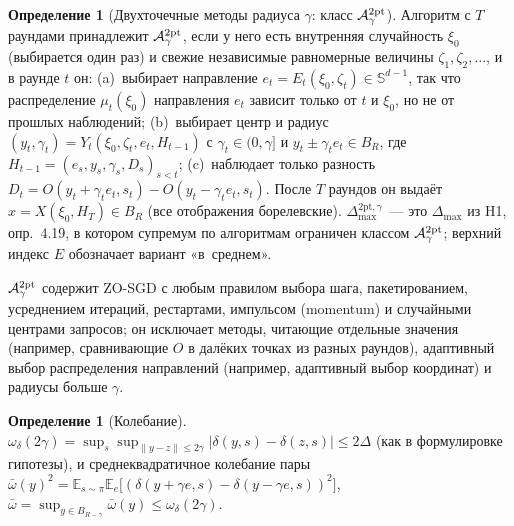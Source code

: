 \documentclass[11pt,a4paper]{article}
\numberwithin{equation}{section}
\theoremstyle{definition}
\newtheorem{definition}[theorem]{Определение}
\theoremstyle{remark}
\newcommand{\E}{\mathbb E}\newcommand{\R}{\mathbb R}\newcommand{\Z}{\mathbb Z}\let\Prob\relax\newcommand{\Prob}{\mathbb P}
\newcommand{\norm}[1]{\lVert #1\rVert}\newcommand{\abs}[1]{\lvert #1\rvert}\newcommand{\ip}[2]{\langle #1,#2\rangle}
\newcommand{\Dmax}{\Delta_{\max}}\newcommand{\Dcp}{\Delta_{\rm cp}}\newcommand{\Dlow}{\Delta_{\rm low}}
\newcommand{\Sph}{\mathbb S^{d-1}}\newcommand{\Ball}{\mathbb B}\newcommand{\iid}{\mathrm{iid}}
\newcommand{\wbar}{\bar\omega}\newcommand{\Atwo}{\cA^{\rm 2pt}_\gamma}
\begin{document}
\begin{definition}[Двухточечные методы радиуса $\gamma$: класс $\Atwo$]\label{def:class}
Алгоритм с $T$ раундами принадлежит $\Atwo$, если у него есть внутренняя случайность $\xi_0$ (выбирается один раз) и свежие независимые равномерные величины $\zeta_1,\zeta_2,\dots$, и в раунде $t$ он:
(a)~выбирает направление $e_t=E_t(\xi_0,\zeta_t)\in\Sph$, так что распределение $\mu_t(\xi_0)$ направления $e_t$ зависит только от $t$ и $\xi_0$, но не от прошлых наблюдений;
(b)~выбирает центр и радиус $(y_t,\gamma_t)=Y_t(\xi_0,\zeta_t,e_t,H_{t-1})$ с $\gamma_t\in(0,\gamma]$ и $y_t\pm\gamma_te_t\in B_R$, где $H_{t-1}=(e_s,y_s,\gamma_s,D_s)_{s<t}$;
(c)~наблюдает только разность $D_t=O(y_t+\gamma_te_t,s_t)-O(y_t-\gamma_te_t,s_t)$.
После $T$ раундов он выдаёт $\hat x=X(\xi_0,H_T)\in B_R$ (все отображения борелевские). $\Dmax^{\mathrm{2pt},\gamma}$~--- это $\Dmax$ из H1, опр.~4.19, в котором супремум по алгоритмам ограничен классом $\Atwo$; верхний индекс $E$ обозначает вариант «в~среднем».
\end{definition}
$\Atwo$ содержит ZO-SGD с любым правилом выбора шага, пакетированием, усреднением итераций, рестартами, импульсом (momentum) и случайными центрами запросов; он исключает методы, читающие отдельные значения (например, сравнивающие $O$ в далёких точках из разных раундов), адаптивный выбор распределения направлений (например, адаптивный выбор координат) и радиусы больше $\gamma$.

\begin{definition}[Колебание]\label{def:osc}
$\omega_\delta(2\gamma)=\sup_s\sup_{\norm{y-z}\le2\gamma}\abs{\delta(y,s)-\delta(z,s)}\le2\Delta$ (как в формулировке гипотезы), и среднеквадратичное колебание пары $\wbar(y)^2=\E_{s\sim\pi}\E_e\big[(\delta(y+\gamma e,s)-\delta(y-\gamma e,s))^2\big]$, $\wbar=\sup_{y\in B_{R-\gamma}}\wbar(y)\le\omega_\delta(2\gamma)$.
\end{definition}
\end{document}
